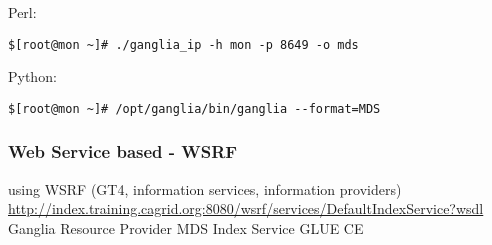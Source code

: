 Perl:
\begin{lstlisting}
$[root@mon ~]# ./ganglia_ip -h mon -p 8649 -o mds
\end{lstlisting}

Python:
\begin{lstlisting}
$[root@mon ~]# /opt/ganglia/bin/ganglia --format=MDS
\end{lstlisting}


\subsubsection{Web Service based - WSRF}
using WSRF (GT4, information services, information providers)
\url{http://index.training.cagrid.org:8080/wsrf/services/DefaultIndexService?wsdl}
Ganglia Resource Provider
MDS Index Service
GLUE CE 
